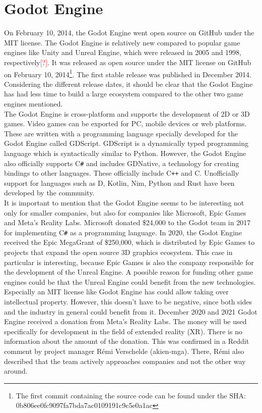 \section{Godot Engine}
On February 10, 2014, the Godot Engine went open source on GitHub under the MIT license.
The Godot Engine is relatively new compared to popular game engines like Unity and Unreal Engine, which were released in 2005 and 1998, respectively\textcolor{red}{[?]}.
It was released as open source under the MIT license on GitHub on February 10, 2014\footnote{The first commit containing the source code can be found under the SHA:\\ 0b806ee0fc9097fa7bda7ac0109191c9c5e0a1ac}\cite{godot-repository}.
The first stable release was published in December 2014\cite{godot-release}.
Considering the different release dates, it should be clear that the Godot Engine has had less time to build a large ecosystem compared to the other two game engines mentioned.\\

The Godot Engine is cross-platform and supports the development of 2D or 3D games\cite{godot-engine}.
Video games can be exported for PC, mobile devices or web platforms.
These are written with a programming language specially developed for the Godot Engine called GDScript.
GDScript is a dynamically typed programming language which is syntactically similar to Python.
However, the Godot Engine also officially supports C\texttt{\#} and includes GDNative, a technology for creating bindings to other languages\cite{godot-gdnative}.
These officially include C\texttt{++} and C.
Unofficially support for languages such as D, Kotlin, Nim, Python and Rust have been developed by the community.\\

It is important to mention that the Godot Engine seems to be interesting not only for smaller companies, but also for companies like Microsoft, Epic Games and Meta's Reality Labs.
Microsoft donated \$24,000 to the Godot team in 2017 for implementing C\texttt{\#} as a programming language\cite{godot-csharp}.
In 2020, the Godot Engine received the Epic MegaGrant of \$250,000, which is distributed by Epic Games to projects that expand the open source 3D graphics ecosystem\cite{godot-megagrant}.
This case in particular is interesting, because Epic \linebreak Games is also the company responsible for the development of the Unreal Engine.
A possible reason for funding other game engines could be that the Unreal Engine could benefit from the new technologies.
Especially an MIT license like Godot Engine has could allow taking over intellectual property.
However, this doesn't have to be negative, since both sides and the industry in general could benefit from it.
December 2020 and 2021 Godot Engine received a donation from Meta's Reality Labs\cite{godot-facebook-reality}\cite{godot-meta-reality}.
The money will be used specifically for development in the field of extended reality (XR).
There is no information about the amount of the donation.
This was confirmed in a Reddit comment by project manager Rémi Verschelde (akien-mga)\cite{reddit-companies-akien}.
There, Rémi also described that the team actively approaches companies and not the other way around.
